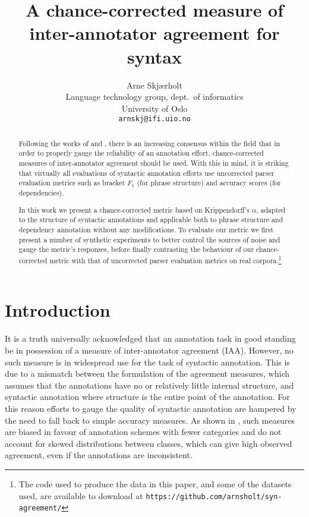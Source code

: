 \documentclass[11pt]{article}
\title{A chance-corrected measure of inter-annotator agreement for syntax}
\author{Arne Skjærholt \\
Language technology group, dept.~of informatics \\
University of Oslo \\
\texttt{arnskj@ifi.uio.no}}
\let\citeN=\newcite
\let\url=\texttt
\begin{document}
\maketitle

\begin{abstract}
    Following the works of \citeN{Carletta96} and \citeN{Art:Poe08}, there is
    an increasing consensus within the field that in order to properly gauge
    the reliability of an annotation effort, chance-corrected measures of
    inter-annotator agreement should be used. With this in mind, it is
    striking that virtually all evaluations of syntactic annotation efforts
    use uncorrected parser evaluation metrics such as bracket $F_1$ (for
    phrase structure) and accuracy scores (for dependencies).

    In this work we present  a chance-corrected metric based on Krippendorff's
    $\alpha$, adapted to the structure of syntactic annotations and applicable
    both to phrase structure and dependency annotation without any
    modifications. To evaluate our metric we first present a number of
    synthetic experiments to better control the sources of noise and gauge the
    metric's responses, before finally contrasting the behaviour of our
    chance-corrected metric with that of uncorrected parser evaluation metrics
    on real corpora.\footnote{The code used to produce the data in this paper,
    and some of the datasets used, are available to download at
    \url{https://github.com/arnsholt/syn-agreement/}}
\end{abstract}

\section{Introduction}
It is a truth universally acknowledged that an annotation task in good
standing be in possession of a measure of inter-annotator agreement (IAA).
However, no such measure is in widespread use for the task of syntactic
annotation. This is due to a mismatch between the formulation of the agreement
measures, which assumes that the annotations have no or
relatively little internal structure, and syntactic annotation where structure
is the entire point of the annotation. For this reason efforts to gauge the
quality of syntactic annotation are hampered by the need to fall back to
simple accuracy measures. As shown in \citeN{Art:Poe08}, such measures are
biased in favour of annotation schemes with fewer categories and do not
account for skewed distributions between classes, which can give high
observed agreement, even if the annotations are inconsistent.
\end{document}
